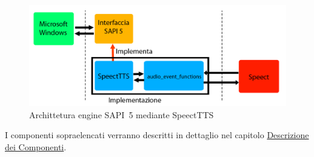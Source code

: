 \begin{figure}[H]
	\centering
	\includegraphics[width=\textwidth]{images/SpeectTTS-sapi5.png}
	\caption{Archittetura engine SAPI~5 mediante SpeectTTS}
\end{figure}

I componenti sopraelencati verranno descritti in dettaglio nel capitolo \hyperref[chap:descrizione-dei-componenti]{Descrizione dei Componenti}.
	
	